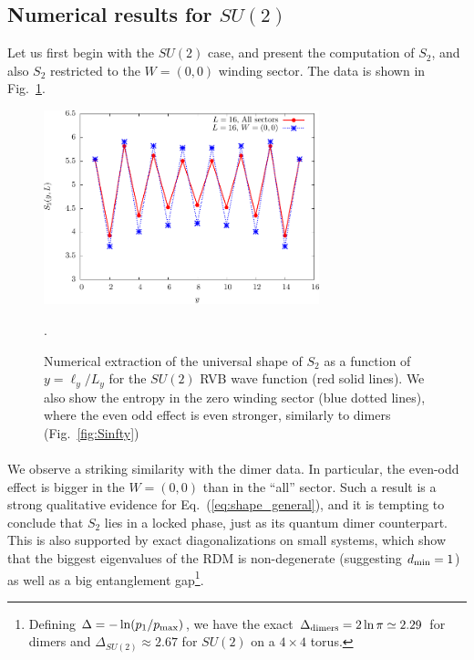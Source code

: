 \documentclass[11pt]{iopart}
\begin{document}
\subsection{Numerical results for $SU(2)$}
\label{sec:su2_numerics}
Let us first begin with the $SU(2)$ case, and present the computation of $S_2$, and also $S_2$ restricted to the $W=(0,0)$ winding sector. The data is shown in Fig.~\ref{fig:SU2_shape}.
\begin{figure}[ht]
 \begin{center}
  \includegraphics[width=8cm]{./figures/SU2_shape.pdf}
 \end{center}
\caption{Numerical extraction of the universal shape of $S_2$ as a function of $y=\ell_y/L_y$ for the $SU(2)$ RVB wave function (red solid lines). We also show the entropy in the zero winding sector (blue dotted lines), where the even odd effect is even stronger, similarly to dimers (Fig.~\ref{fig:Sinfty})}.
\label{fig:SU2_shape}
\end{figure}
\paragraph{}We observe a striking similarity with the dimer data. In particular, the even-odd effect is bigger in the $W=(0,0)$ than in the ``all'' sector. Such a result is a strong qualitative evidence for Eq.~(\ref{eq:shape_general}), and it is tempting to conclude that $S_2$ lies in a locked phase, just as its quantum dimer counterpart. This is also supported by exact diagonalizations on small systems, which show that the biggest eigenvalues of the RDM is non-degenerate (suggesting $d_{\rm min}=1$) as well as a big entanglement gap\footnote{Defining $\Delta=-\ln (p_1/p_{\rm max})$, we have the exact\cite{Stephan2012,FisherStephenson} $\Delta_{\rm dimers}=2\ln \pi\simeq 2.29$ for dimers and $\Delta_{SU(2)}\approx 2.67$ for $SU(2)$ on a $4\times 4$ torus.}. 
\end{document}
